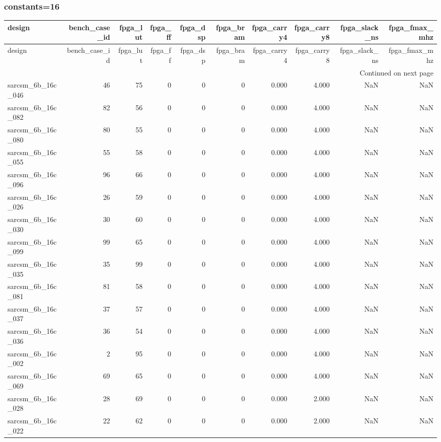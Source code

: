\documentclass{article}
\begin{document}
\subsubsection*{constants=16}
\begin{longtable}{lrrrrrrrrr}
\toprule
design & bench\_case\_id & fpga\_lut & fpga\_ff & fpga\_dsp & fpga\_bram & fpga\_carry4 & fpga\_carry8 & fpga\_slack\_ns & fpga\_fmax\_mhz \\
\midrule
\endfirsthead
\toprule
design & bench\_case\_id & fpga\_lut & fpga\_ff & fpga\_dsp & fpga\_bram & fpga\_carry4 & fpga\_carry8 & fpga\_slack\_ns & fpga\_fmax\_mhz \\
\midrule
\endhead
\midrule
\multicolumn{10}{r}{Continued on next page} \\
\midrule
\endfoot
\bottomrule
\endlastfoot
sarcsm\_6b\_16c\_046 & 46 & 75 & 0 & 0 & 0 & 0.000 & 4.000 & NaN & NaN \\
sarcsm\_6b\_16c\_082 & 82 & 56 & 0 & 0 & 0 & 0.000 & 4.000 & NaN & NaN \\
sarcsm\_6b\_16c\_080 & 80 & 55 & 0 & 0 & 0 & 0.000 & 4.000 & NaN & NaN \\
sarcsm\_6b\_16c\_055 & 55 & 58 & 0 & 0 & 0 & 0.000 & 4.000 & NaN & NaN \\
sarcsm\_6b\_16c\_096 & 96 & 66 & 0 & 0 & 0 & 0.000 & 4.000 & NaN & NaN \\
sarcsm\_6b\_16c\_026 & 26 & 59 & 0 & 0 & 0 & 0.000 & 4.000 & NaN & NaN \\
sarcsm\_6b\_16c\_030 & 30 & 60 & 0 & 0 & 0 & 0.000 & 4.000 & NaN & NaN \\
sarcsm\_6b\_16c\_099 & 99 & 65 & 0 & 0 & 0 & 0.000 & 4.000 & NaN & NaN \\
sarcsm\_6b\_16c\_035 & 35 & 99 & 0 & 0 & 0 & 0.000 & 4.000 & NaN & NaN \\
sarcsm\_6b\_16c\_081 & 81 & 58 & 0 & 0 & 0 & 0.000 & 4.000 & NaN & NaN \\
sarcsm\_6b\_16c\_037 & 37 & 57 & 0 & 0 & 0 & 0.000 & 4.000 & NaN & NaN \\
sarcsm\_6b\_16c\_036 & 36 & 54 & 0 & 0 & 0 & 0.000 & 4.000 & NaN & NaN \\
sarcsm\_6b\_16c\_002 & 2 & 95 & 0 & 0 & 0 & 0.000 & 4.000 & NaN & NaN \\
sarcsm\_6b\_16c\_069 & 69 & 65 & 0 & 0 & 0 & 0.000 & 4.000 & NaN & NaN \\
sarcsm\_6b\_16c\_028 & 28 & 69 & 0 & 0 & 0 & 0.000 & 2.000 & NaN & NaN \\
sarcsm\_6b\_16c\_022 & 22 & 62 & 0 & 0 & 0 & 0.000 & 2.000 & NaN & NaN \\

\end{longtable}
\end{document}
